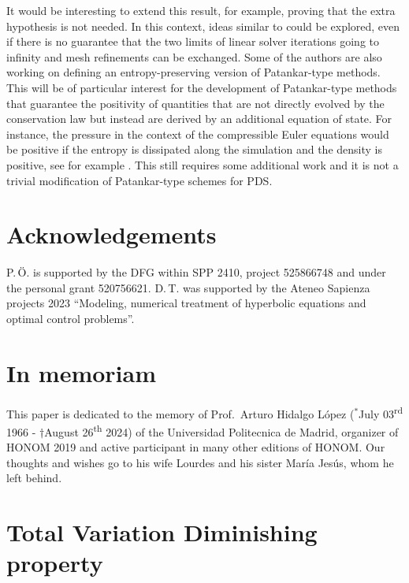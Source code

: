 \documentclass[final,11pt, times, linenumber, nopreprintline]{elsarticle}
\begin{document}
It would be interesting to extend this result, for example, proving that the extra hypothesis is not needed. In this context, ideas similar to \cite{birken_conservation_2022} could be explored, even if there is no guarantee that the two limits of linear solver iterations going to infinity and mesh refinements can be exchanged. 
Some of the authors are also working on defining an entropy-preserving version of Patankar-type methods. This will be of particular interest for the development of Patankar-type methods that guarantee the positivity of quantities that are not directly evolved by the conservation law but instead are derived by an additional equation of state. For instance, the pressure in the context of the compressible Euler equations would be positive if the entropy is dissipated along the simulation and the density is positive, see for example \cite{berthon2025towards}. 
This still requires some additional work and it is not a trivial modification of Patankar-type schemes for PDS.

\section*{Acknowledgements}
P.\,Ö. is supported by the DFG within SPP 2410, project  525866748 and under the personal grant 520756621. D.\,T. was supported by the Ateneo Sapienza projects 2023 “Modeling, numerical treatment of hyperbolic equations and optimal control problems”.

\noindent \section*{In memoriam}
 
\noindent This paper is dedicated to the memory of Prof.\ Arturo Hidalgo L\'opez
($^*$July 03\textsuperscript{rd} 1966 - $\dagger$August 26\textsuperscript{th} 2024) of the Universidad Politecnica de Madrid, organizer of HONOM 2019 and active participant in many other editions of HONOM.
Our thoughts and wishes go to his wife Lourdes and his sister Mar\'ia Jes\'us, whom he left behind.

\appendix
\section{Total Variation Diminishing property}\label{sec:TVD}
\end{document}
